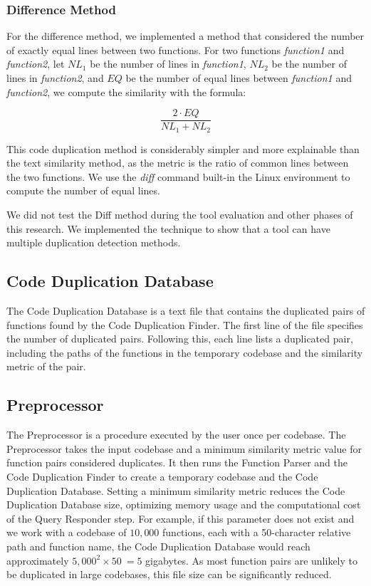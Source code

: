 \subsubsection{Difference Method}

For the difference method, 
we implemented a method that considered the number of exactly equal lines between two functions.
For two functions \textit{function1} and \textit{function2}, let $NL_1$ be the number of lines in \textit{function1},
$NL_2$ be the number of lines in \textit{function2}, and $EQ$ be the number of equal lines between \textit{function1} and
\textit{function2}, we compute the similarity with the formula:

$$\frac{2 \cdot EQ}{NL_1 + NL_2}$$

This code duplication method is considerably simpler and more explainable than the text similarity method, 
as the metric is the ratio of common lines between the two functions. 
We use the \textit{diff} command built-in the Linux environment \citep{diffcommand}
to compute the number of equal lines.

We did not test the Diff method during the tool evaluation and other phases of this research. 
We implemented the technique to show that a tool can have multiple duplication detection methods.

\subsection{Code Duplication Database}

The Code Duplication Database is a text file that contains the duplicated pairs of functions found by the Code Duplication Finder. The first line of the file specifies the number of duplicated pairs. Following this, each line lists a duplicated pair, including the paths of the functions in the temporary codebase and the similarity metric of the pair.

\subsection{Preprocessor}
\label{subsec:setup}

The Preprocessor is a procedure executed by the user once per codebase. 
The Preprocessor takes the input codebase and a minimum similarity metric value for function pairs considered duplicates. 
It then runs the Function Parser and the Code Duplication Finder to create a temporary codebase and the Code Duplication Database. 
Setting a minimum similarity metric reduces the Code Duplication Database size, optimizing memory usage and the computational 
cost of the Query Responder step. For example, if this parameter does not exist and we work with a codebase of $10,000$ functions, 
each with a 50-character relative path and function name, the Code Duplication Database would reach approximately $5,000^2 \times 50 ~= 5$ gigabytes. 
As most function pairs are unlikely to be duplicated in large codebases, this file size can be significantly reduced.

